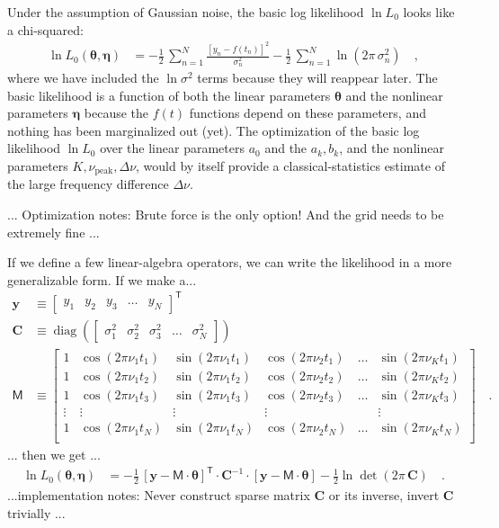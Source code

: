\documentclass[modern]{aastex63}
\newcommand{\nupeak}{\nu_\mathrm{peak}}
\newcommand{\T}{^{\!\mathsf{T}\!}}
\newcommand{\inv}{^{-1}}
\renewcommand{\vector}[1]{\boldsymbol{#1}}
\newcommand{\vy}{\vector{y}}
\newcommand{\veta}{\vector{\eta}}
\newcommand{\vtheta}{\vector{\theta}}
\renewcommand{\tensor}[1]{\mathbf{#1}}
\newcommand{\tC}{\tensor{C}}
\DeclareMathOperator{\diag}{diag}
\newcommand{\mat}[1]{\mathsf{#1}}
\newcommand{\mM}{\mat{M}}
\begin{document}
Under the assumption of Gaussian noise, the basic log likelihood $\ln L_0$ looks like a
chi-squared:
\begin{align}\label{eq:like}
  \ln L_0(\vtheta,\veta)
  &= -\frac{1}{2}\,\sum_{n=1}^N \frac{[y_n - f(t_n)]^2}{\sigma_n^2}
     -\frac{1}{2}\,\sum_{n=1}^N \ln(2\pi\,\sigma_n^2)
  \quad,
\end{align}
where we have included the $\ln\sigma^2$ terms because they will reappear later.
The basic likelihood is a function of both the linear parameters $\vtheta$ and
the nonlinear parameters $\veta$ because the $f(t)$ functions depend on these
parameters, and nothing has been marginalized out (yet).
The optimization of the basic log likelihood $\ln L_0$
over the linear parameters $a_0$ and the $a_k, b_k$, and the nonlinear
parameters $K, \nupeak, \Delta\nu$, would by itself provide a
classical-statistics estimate of the large frequency difference
$\Delta\nu$.

... Optimization notes: Brute force is the only option! And the grid needs
to be extremely fine ...

If we define a few linear-algebra operators, we can write the likelihood in a more
generalizable form.
If we make a...
\begin{align}
  \vy &\equiv \begin{bmatrix} y_1 & y_2 & y_3 & \hdots & y_N \end{bmatrix}\T
  \\
  \tC &\equiv \diag(\begin{bmatrix} \sigma_1^2 & \sigma_2^2 & \sigma_3^2 & \hdots & \sigma_N^2 \end{bmatrix})
  \\
  \mM &\equiv \begin{bmatrix}
    1 & \cos(2\pi\nu_1 t_1) & \sin(2\pi\nu_1 t_1) & \cos(2\pi\nu_2 t_1) & \hdots & \sin(2\pi\nu_K t_1) \\
    1 & \cos(2\pi\nu_1 t_2) & \sin(2\pi\nu_1 t_2) & \cos(2\pi\nu_2 t_2) & \hdots & \sin(2\pi\nu_K t_2) \\
    1 & \cos(2\pi\nu_1 t_3) & \sin(2\pi\nu_1 t_3) & \cos(2\pi\nu_2 t_3) & \hdots & \sin(2\pi\nu_K t_3) \\
    \vdots & \vdots         & \vdots              & \vdots              &        & \vdots \\
    1 & \cos(2\pi\nu_1 t_N) & \sin(2\pi\nu_1 t_N) & \cos(2\pi\nu_2 t_N) & \hdots & \sin(2\pi\nu_K t_N) \\
  \end{bmatrix}
  \quad .
\end{align}
... then we get ...
\begin{align}
  \ln L_0(\vtheta,\veta) &= -\frac{1}{2}\,[\vy - \mM\cdot\vtheta]\T\cdot\tC\inv\cdot[\vy - \mM\cdot\vtheta] - \frac{1}{2}\ln\det(2\pi\,\tC)
  \quad .
\end{align}
...implementation notes: Never construct sparse matrix $\tC$ or its inverse, invert $\tC$ trivially ...
\end{document}

